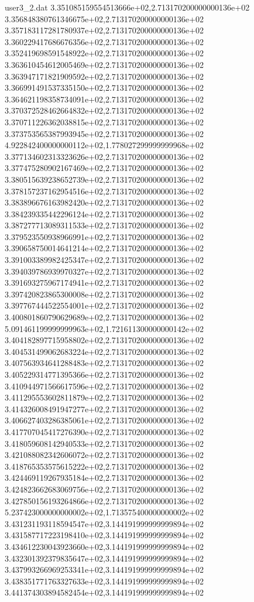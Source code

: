\begin{filecontents}{user3_2.dat}
3.351085159554513666e+02,2.713170200000000136e+02
3.356848380761346675e+02,2.713170200000000136e+02
3.357183117281780937e+02,2.713170200000000136e+02
3.360229417686676356e+02,2.713170200000000136e+02
3.352419698591548922e+02,2.713170200000000136e+02
3.363610454612005469e+02,2.713170200000000136e+02
3.363947171821909592e+02,2.713170200000000136e+02
3.366991491537335150e+02,2.713170200000000136e+02
3.364621198358734091e+02,2.713170200000000136e+02
3.370372528462664832e+02,2.713170200000000136e+02
3.370711226362038815e+02,2.713170200000000136e+02
3.373753565387993945e+02,2.713170200000000136e+02
4.922842400000000112e+02,1.778027299999999968e+02
3.377134602313323626e+02,2.713170200000000136e+02
3.377475280902167469e+02,2.713170200000000136e+02
3.380515639238652739e+02,2.713170200000000136e+02
3.378157237162954516e+02,2.713170200000000136e+02
3.383896676163982420e+02,2.713170200000000136e+02
3.384239335442296124e+02,2.713170200000000136e+02
3.387277713089311533e+02,2.713170200000000136e+02
3.379523550938966991e+02,2.713170200000000136e+02
3.390658750014641214e+02,2.713170200000000136e+02
3.391003389982425347e+02,2.713170200000000136e+02
3.394039786939970327e+02,2.713170200000000136e+02
3.391693275967174941e+02,2.713170200000000136e+02
3.397420823865300008e+02,2.713170200000000136e+02
3.397767444522554001e+02,2.713170200000000136e+02
3.400801860790629689e+02,2.713170200000000136e+02
5.091461199999999963e+02,1.721611300000000142e+02
3.404182897715958802e+02,2.713170200000000136e+02
3.404531499062683224e+02,2.713170200000000136e+02
3.407563934641288483e+02,2.713170200000000136e+02
3.405229314771395366e+02,2.713170200000000136e+02
3.410944971566617596e+02,2.713170200000000136e+02
3.411295553602811879e+02,2.713170200000000136e+02
3.414326008491947277e+02,2.713170200000000136e+02
3.406627403286385061e+02,2.713170200000000136e+02
3.417707045417276390e+02,2.713170200000000136e+02
3.418059608142940533e+02,2.713170200000000136e+02
3.421088082342606072e+02,2.713170200000000136e+02
3.418765353575615222e+02,2.713170200000000136e+02
3.424469119267935184e+02,2.713170200000000136e+02
3.424823662683069756e+02,2.713170200000000136e+02
3.427850156193264866e+02,2.713170200000000136e+02
5.237423000000000002e+02,1.713575400000000002e+02
3.431231193118594547e+02,3.144191999999999894e+02
3.431587717223198410e+02,3.144191999999999894e+02
3.434612230043923660e+02,3.144191999999999894e+02
3.432301392379835647e+02,3.144191999999999894e+02
3.437993266969253341e+02,3.144191999999999894e+02
3.438351771763327633e+02,3.144191999999999894e+02
3.441374303894582454e+02,3.144191999999999894e+02

\end{filecontents}
